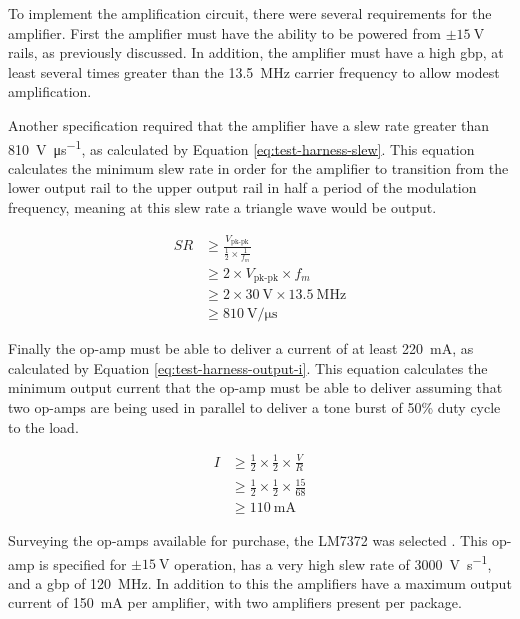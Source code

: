 To implement the amplification circuit, there were several requirements for the amplifier. First the amplifier must have the ability to be powered from  $\pm \SI{15}{\volt}$ rails, as previously discussed. In addition, the amplifier must have a high \gls{gbp}, at least several times greater than the \SI{13.5}{\mega\hertz} carrier frequency to allow modest amplification.

Another specification required that the amplifier have a slew rate greater than \SI{810}{\volt\per\micro\second}, as calculated by Equation \ref{eq:test-harness-slew}. This equation calculates the minimum slew rate in order for the amplifier to transition from the lower output rail to the upper output rail in half a period of the modulation frequency, meaning at this slew rate a triangle wave would be output.

\begin{align}
	SR &\geq \frac{V_\text{pk-pk}}{\frac{1}{2} \times \frac{1}{f_m}}  \nonumber \\
	&\geq 2 \times V_\text{pk-pk} \times f_m  \nonumber \\
	&\geq 2 \times \SI{30}{\volt} \times \SI{13.5}{\mega\hertz}  \nonumber \\
	&\geq \SI{810}{\volt\per\micro\second} \label{eq:test-harness-slew}
\end{align}

Finally the op-amp must be able to deliver a current of at least \SI{220}{\milli\ampere}, as calculated by Equation \ref{eq:test-harness-output-i}. This equation calculates the minimum output current that the op-amp must be able to deliver assuming that two op-amps are being used in parallel to deliver a tone burst of 50\% duty cycle to the load.

\begin{align}
I &\geq \frac{1}{2} \times \frac{1}{2} \times \frac{V}{R}  \nonumber \\
&\geq \frac{1}{2} \times \frac{1}{2} \times \frac{15}{68}  \nonumber \\
&\geq \SI{110}{\milli\ampere} \label{eq:test-harness-output-i}
\end{align}

Surveying the op-amps available for purchase, the LM7372 was selected \cite{ti2014}. This op-amp is specified for $\pm \SI{15}{\volt}$ operation, has a very high slew rate of \SI{3000}{\volt\per\second}, and a \gls{gbp} of \SI{120}{\mega\hertz}. In addition to this the amplifiers have a maximum output current of \SI{150}{\milli\ampere} per amplifier, with two amplifiers present per package.

